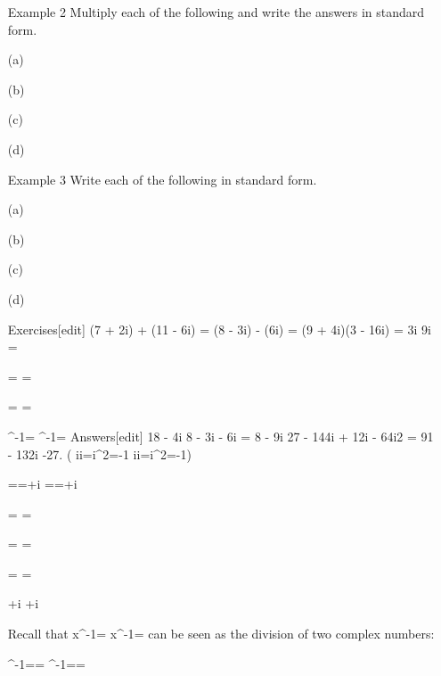 \begin{enumerate}
Example 2  Multiply each of the following and write the answers in standard form.
\item[(a)]    
\item[(b)]    
\item[(c)]    
\item[(d)]    


Example 3  Write each of the following in standard form.
\item[(a)]    
\item[(b)]    
\item[(c)]    
\item[(d)]    


Exercises[edit]
(7 + 2i) + (11 - 6i) =
(8 - 3i) - (6i) =
(9 + 4i)(3 - 16i) =
3i {\displaystyle \times } \times  9i =

{=} {=}

{=} {=}

{^{-1}=} {^{-1}=}
Answers[edit]
18 - 4i
8 - 3i - 6i = 8 - 9i
27 - 144i + 12i - 64i2 = 91 - 132i
-27. ( {\displaystyle i\times i=i^{2}=-1} {\displaystyle i\times i=i^{2}=-1})

{={}={}+{}i} {={}={}+{}i}

{=} {=}

{=} {=}

{=} {=}

{+{}i} {+{}i}


Recall that {\displaystyle x^{-1}={}} {\displaystyle x^{-1}={}} can be seen as the division of two complex numbers:

{^{-1}={}=} {^{-1}={}=}


\end{enumerate}
